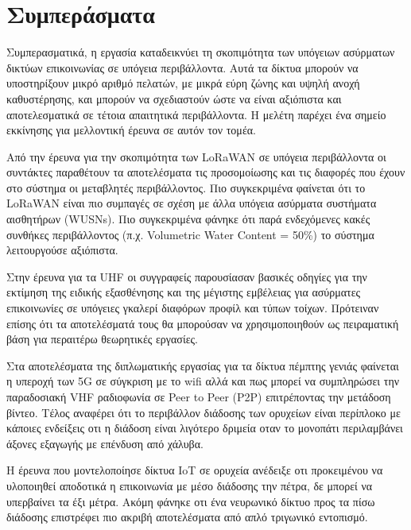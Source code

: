 \section{\textsf{Συμπεράσματα}}
        Συμπερασματικά, η εργασία καταδεικνύει τη σκοπιμότητα των
        υπόγειων ασύρματων δικτύων επικοινωνίας σε υπόγεια περιβάλλοντα. Αυτά τα δίκτυα
        μπορούν να υποστηρίξουν μικρό αριθμό πελατών, με μικρά εύρη ζώνης και υψηλή ανοχή
        καθυστέρησης, και μπορούν να σχεδιαστούν ώστε να είναι αξιόπιστα και αποτελεσματικά σε
        τέτοια απαιτητικά περιβάλλοντα. Η μελέτη παρέχει ένα σημείο εκκίνησης για μελλοντική
        έρευνα σε αυτόν τον τομέα.

        Από την έρευνα για την σκοπιμότητα των LoRaWAN σε υπόγεια περιβάλλοντα 
        \cite{zhao_feasibility_2023} οι συντάκτες παραθέτουν τα αποτελέσματα τις προσομοίωσης
        και τις διαφορές που έχουν στο σύστημα οι μεταβλητές περιβάλλοντος. Πιο συγκεκριμένα
        φαίνεται ότι το LoRaWAN είναι πιο συμπαγές σε σχέση με άλλα υπόγεια ασύρματα συστήματα
        αισθητήρων (WUSNs). Πιο συγκεκριμένα φάνηκε ότι παρά ενδεχόμενες κακές συνθήκες 
        περιβάλλοντος (π.χ. Volumetric Water Content = 50\%) το σύστημα λειτουργούσε αξιόπιστα.

        Στην έρευνα για τα UHF \cite{rak_uhf_2007} οι συγγραφείς παρουσίασαν βασικές οδηγίες
        για την εκτίμηση της ειδικής εξασθένησης και της μέγιστης εμβέλειας για ασύρματες
        επικοινωνίες σε υπόγειες γκαλερί διαφόρων προφίλ και τύπων τοίχων. Πρότειναν επίσης 
        ότι τα αποτελέσματά τους θα μπορούσαν να χρησιμοποιηθούν ως πειραματική βάση για 
        περαιτέρω θεωρητικές εργασίες.

        Στα αποτελέσματα της διπλωματικής εργασίας για τα δίκτυα πέμπτης γενιάς \cite{branch_fifth_2021}
        φαίνεται η υπεροχή των 5G σε σύγκριση με το wifi αλλά και πως μπορεί να συμπληρώσει
        την παραδοσιακή VHF ραδιοφωνία σε Peer to Peer (P2P) επιτρέποντας την μετάδοση βίντεο.
        Τέλος αναφέρει ότι το περιβάλλον διάδοσης των ορυχείων είναι περίπλοκο με κάποιες ενδείξεις
        οτι η διάδοση είναι λιγότερο δριμεία οταν το μονοπάτι περιλαμβάνει άξονες εξαγωγής με
        επένδυση από χάλυβα.

        Η έρευνα που μοντελοποίησε δίκτυα IoT σε ορυχεία \cite{ming_study_2019} ανέδειξε οτι 
        προκειμένου να υλοποιηθεί αποδοτικά η επικοινωνία με μέσο διάδοσης την πέτρα, δε μπορεί
        να υπερβαίνει τα έξι μέτρα. Ακόμη φάνηκε οτι ένα νευρωνικό δίκτυο προς τα πίσω διάδοσης
        επιστρέφει πιο ακριβή αποτελέσματα από απλό τριγωνικό εντοπισμό.

